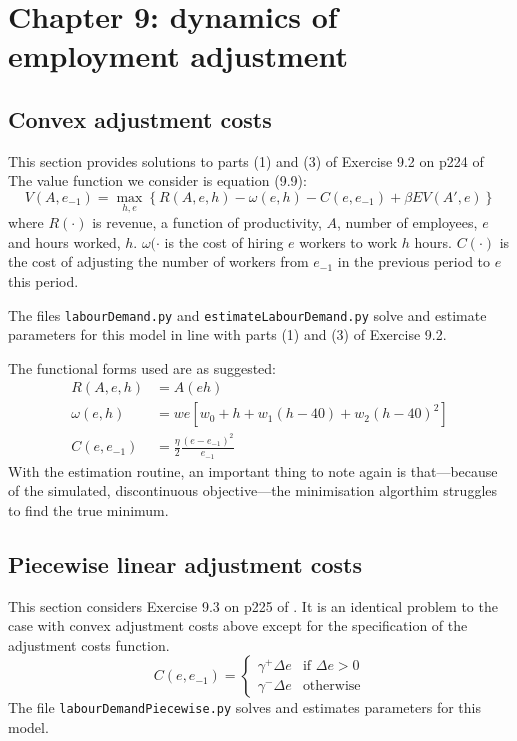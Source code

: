 \section{Chapter 9: dynamics of employment adjustment}

\subsection{Convex adjustment costs} \label{sub:demandconvex}

This section provides solutions to parts (1) and (3) of Exercise 9.2 on p224 \citet{adda2003dynamic} of The value function we consider is equation (9.9):
%
\begin{equation}
	V(A, e_{-1}) = \max_{h,e} \left\{ R(A,e,h) - \omega(e,h) - C(e,e_{-1}) + \beta EV(A', e) \right\}
\end{equation}
%
where \(R(\cdot)\) is revenue, a function of productivity, \(A\), number of employees, \(e\) and hours worked, \(h\). \(\omega(\cdot\) is the cost of hiring \(e\) workers to work \(h\) hours. \(C(\cdot)\) is the cost of adjusting the number of workers from \(e_{-1}\) in the previous period to \(e\) this period.

The files \texttt{labourDemand.py} and \texttt{estimateLabourDemand.py} solve and estimate parameters for this model in line with parts (1) and (3) of Exercise 9.2.

The functional forms used are as suggested:
%
\begin{align}
 R(A,e,h) &=  A(eh) \\
 \omega(e,h) &= we\left[w_0 + h + w_1(h - 40) + w_2(h - 40)^2\right] \\
 C(e,e_{-1}) &= \frac{\eta}{2}\frac{(e - e_{-1})^2}{e_{-1}}
\end{align}
%
With the estimation routine, an important thing to note again is that---because of the simulated, discontinuous objective---the minimisation algorthim struggles to find the true minimum.

\subsection{Piecewise linear adjustment costs}

This section considers Exercise 9.3 on p225 of \citet{adda2003dynamic}. It is an identical problem to the case with convex adjustment costs above except for the specification of the adjustment costs function.
%
\begin{equation}
  C(e,e_{-1})=\begin{cases}
    \gamma^{+}\Delta e & \text{if $\Delta e > 0$}\\
    \gamma^{-}\Delta e & \text{otherwise}
  \end{cases}
\end{equation}
%
The file \texttt{labourDemandPiecewise.py} solves and estimates parameters for this model.

